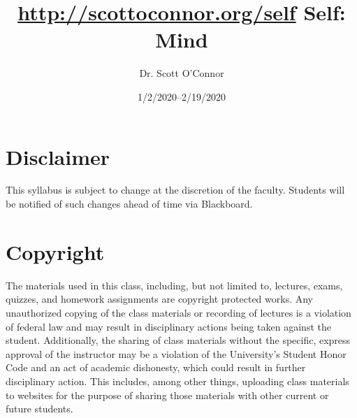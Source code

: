 \documentclass[article,oneside]{memoir}
\def\myauthor{Author}
\def\mytitle{Title}
\def\mycopyright{\myauthor}
\def\myweb{\href{http://scottoconnor.org/self}{http://scottoconnor.org/self}}
\def\myauthor{Dr. Scott O'Connor}
\def\mytitle{{\normalsize \myweb \newline} \HUGE Self: Mind}
\begin{document}
\setsansfont[Mapping=tex-text]{Myriad Pro} 
\setmonofont[Mapping=tex-text,Scale=0.8]{Georgia} 

\def\ind{\hangindent=1 true cm\hangafter=1 \noindent}
\def\labelitemi{$\cdot$}


\title{\LARGE \mytitle}     
\author{\Large\myauthor %
}
\date{1/2/2020--2/19/2020}


\maketitle




%
%


\section{Disclaimer}
 This syllabus is subject to change at the discretion of the faculty. Students will be notified of such changes ahead of time via Blackboard. 


\section{Copyright}
The materials used in this class, including, but not limited to, lectures, exams, quizzes, and homework assignments are copyright protected works.  Any unauthorized copying of the class materials or recording of lectures is a violation of federal law and may result in disciplinary actions being taken against the student.  Additionally, the sharing of class materials without the specific, express approval of the instructor may be a violation of the University's Student Honor Code and an act of academic dishonesty, which could result in further disciplinary action.  This includes, among other things, uploading class materials to websites for the purpose of sharing those materials with other current or future students. 
\end{document}
